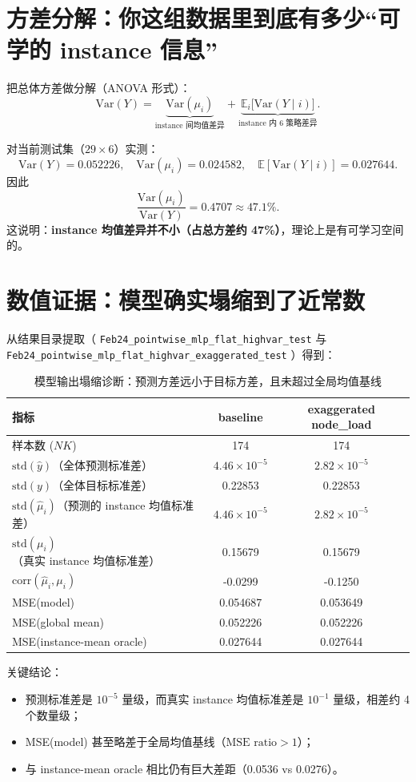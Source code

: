 \documentclass[11pt]{article}
\begin{document}
\section{方差分解：你这组数据里到底有多少“可学的 instance 信息”}
把总体方差做分解（ANOVA 形式）：
\[
\mathrm{Var}(Y)=\underbrace{\mathrm{Var}(\mu_i)}_{\text{instance 间均值差异}}
+\underbrace{\mathbb E_i\big[\mathrm{Var}(Y\mid i)\big]}_{\text{instance 内 6 策略差异}}.
\]

对当前测试集（$29\times 6$）实测：
\[
\mathrm{Var}(Y)=0.052226,
\quad \mathrm{Var}(\mu_i)=0.024582,
\quad \mathbb E[\mathrm{Var}(Y\mid i)]=0.027644.
\]
因此
\[
\frac{\mathrm{Var}(\mu_i)}{\mathrm{Var}(Y)}=0.4707\approx 47.1\%.
\]
这说明：\textbf{instance 均值差异并不小（占总方差约 47\%）}，理论上是有可学习空间的。

\section{数值证据：模型确实塌缩到了近常数}
从结果目录提取（
\texttt{Feb24\_pointwise\_mlp\_flat\_highvar\_test} 与
\texttt{Feb24\_pointwise\_mlp\_flat\_highvar\_exaggerated\_test}
）得到：

\begin{table}[h]
\centering
\begin{tabular}{lcc}
\toprule
指标 & baseline & exaggerated node\_load \\
\midrule
样本数 ($NK$) & 174 & 174 \\
$\mathrm{std}(\hat y)$（全体预测标准差） & $4.46\times 10^{-5}$ & $2.82\times 10^{-5}$ \\
$\mathrm{std}(y)$（全体目标标准差） & 0.22853 & 0.22853 \\
$\mathrm{std}(\hat\mu_i)$（预测的 instance 均值标准差） & $4.46\times 10^{-5}$ & $2.82\times 10^{-5}$ \\
$\mathrm{std}(\mu_i)$（真实 instance 均值标准差） & 0.15679 & 0.15679 \\
$\mathrm{corr}(\hat\mu_i,\mu_i)$ & -0.0299 & -0.1250 \\
MSE(model) & 0.054687 & 0.053649 \\
MSE(global mean) & 0.052226 & 0.052226 \\
MSE(instance-mean oracle) & 0.027644 & 0.027644 \\
\bottomrule
\end{tabular}
\caption{模型输出塌缩诊断：预测方差远小于目标方差，且未超过全局均值基线}
\end{table}

关键结论：
\begin{itemize}
  \item 预测标准差是 $10^{-5}$ 量级，而真实 instance 均值标准差是 $10^{-1}$ 量级，相差约 4 个数量级；
  \item MSE(model) 甚至略差于全局均值基线（$\text{MSE ratio}>1$）；
  \item 与 instance-mean oracle 相比仍有巨大差距（0.0536 vs 0.0276）。
\end{itemize}
\end{document}
